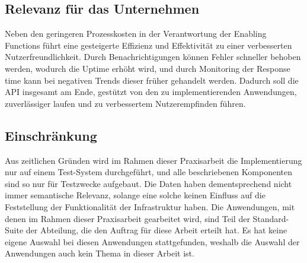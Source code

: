 \subsection{Relevanz für das Unternehmen}
Neben den geringeren Prozesskosten in der Verantwortung der Enabling Functions führt eine gesteigerte Effizienz und Effektivität zu einer verbesserten Nutzerfreundlichkeit. Durch Benachrichtigungen können Fehler schneller behoben werden, wodurch die Uptime erhöht wird, und durch Monitoring der Response time kann bei negativen Trends dieser früher gehandelt werden. Dadurch soll die API insgesamt am Ende, gestützt von den zu implementierenden Anwendungen, zuverlässiger laufen und zu verbessertem Nutzerempfinden führen.
\subsection{Einschränkung}
Aus zeitlichen Gründen wird im Rahmen dieser Praxisarbeit die Implementierung nur auf einem Test-System durchgeführt, und alle beschriebenen Komponenten sind so nur für Testzwecke aufgebaut. Die Daten haben dementsprechend nicht immer semantische Relevanz, solange eine solche keinen Einfluss auf die Feststellung der Funktionalität der Infrastruktur haben. Die Anwendungen, mit denen im Rahmen dieser Praxisarbeit gearbeitet wird, sind Teil der Standard-Suite der Abteilung, die den Auftrag für diese Arbeit erteilt hat. Es hat keine eigene Auswahl bei diesen Anwendungen stattgefunden, weshalb die Auswahl der Anwendungen auch kein Thema in dieser Arbeit ist.